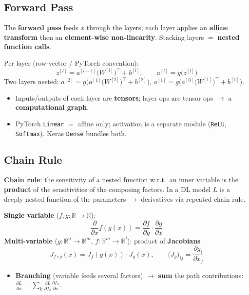 \documentclass[10pt,a4paper]{article}
\begin{document}
	\subsection{Forward Pass}

	\begin{definitionbox}
		The \textbf{forward pass} feeds $x$ through the layers; each layer applies an \textbf{affine transform} then an \textbf{element-wise non-linearity}. Stacking layers $=$ \textbf{nested function calls}.
	\end{definitionbox}

	\begin{formulabox}
		Per layer (row-vector / PyTorch convention):
		\[
		z^{[l]} = a^{[l-1]}\big(W^{[l]}\big)^{\!\top} + b^{[l]}, \qquad a^{[l]} = g\big(z^{[l]}\big)
		\]
		Two layers nested: $a^{[2]} = g\!\Big(a^{[1]}\big(W^{[2]}\big)^{\!\top}+b^{[2]}\Big)$, \; $a^{[1]} = g\!\Big(a^{[0]}\big(W^{[1]}\big)^{\!\top}+b^{[1]}\Big)$.
	\end{formulabox}
	\begin{itemize}[leftmargin=*]
		\item Inputs/outputs of each layer are \textbf{tensors}; layer ops are tensor ops $\rightarrow$ a \textbf{computational graph}.
		\item PyTorch \texttt{Linear} $=$ affine only; activation is a separate module (\texttt{ReLU}, \texttt{Softmax}). Keras \texttt{Dense} bundles both.
	\end{itemize}

	\subsection{Chain Rule}

	\begin{definitionbox}
		\textbf{Chain rule}: the sensitivity of a nested function w.r.t.\ an inner variable is the \textbf{product} of the sensitivities of the composing factors. In a DL model $L$ is a deeply nested function of the parameters $\rightarrow$ derivatives via repeated chain rule.
	\end{definitionbox}

	\begin{formulabox}
		\textbf{Single variable} ($f,g:\mathbb{R}\to\mathbb{R}$):
		\[
		\frac{\partial}{\partial x} f(g(x)) = \frac{\partial f}{\partial g}\cdot\frac{\partial g}{\partial x}
		\]
		\textbf{Multi-variable} ($g:\mathbb{R}^n\!\to\mathbb{R}^m$, $f:\mathbb{R}^m\!\to\mathbb{R}^l$): product of \textbf{Jacobians}
		\[
		J_{f\circ g}(x) = J_f(g(x))\cdot J_g(x), \qquad
		\big(J_g\big)_{ij} = \frac{\partial g_i}{\partial x_j}
		\]
	\end{formulabox}
	\begin{itemize}[leftmargin=*]
		\item \textbf{Branching} (variable feeds several factors) $\rightarrow$ \textbf{sum} the path contributions: $\frac{\partial L}{\partial x}=\sum_k \frac{\partial L}{\partial f_k}\frac{\partial f_k}{\partial x}$.
	\end{itemize}
\end{document}
